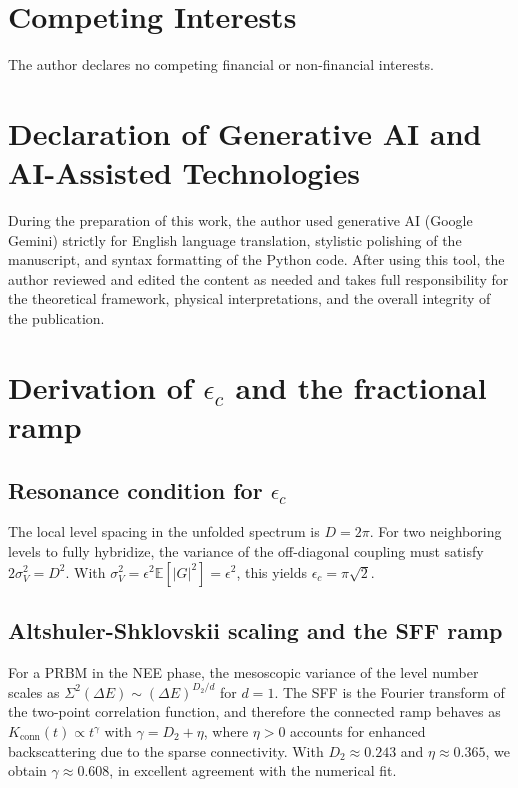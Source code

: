 \documentclass[aps,prl,preprint,superscriptaddress,floatfix]{revtex4-2}
\begin{document}
\section*{Competing Interests}
The author declares no competing financial or non-financial interests.

\section*{Declaration of Generative AI and AI-Assisted Technologies}
During the preparation of this work, the author used generative AI (Google Gemini) strictly for English language translation, stylistic polishing of the manuscript, and syntax formatting of the Python code. After using this tool, the author reviewed and edited the content as needed and takes full responsibility for the theoretical framework, physical interpretations, and the overall integrity of the publication.

\appendix

\section{Derivation of $\epsilon_c$ and the fractional ramp}
\label{app:ramp}

\subsection{Resonance condition for $\epsilon_c$}
The local level spacing in the unfolded spectrum is $D=2\pi$. For two neighboring levels to fully hybridize, the variance of the off-diagonal coupling must satisfy $2\sigma_V^2 = D^2$. With $\sigma_V^2 = \epsilon^2 \mathbb{E}[|G|^2] = \epsilon^2$, this yields $\epsilon_c = \pi\sqrt{2}$.

\subsection{Altshuler-Shklovskii scaling and the SFF ramp}
For a PRBM in the NEE phase, the mesoscopic variance of the level number scales as $\Sigma^2(\Delta E) \sim (\Delta E)^{D_2/d}$ for $d=1$. The SFF is the Fourier transform of the two-point correlation function, and therefore the connected ramp behaves as $K_{\text{conn}}(t) \propto t^{\gamma}$ with $\gamma = D_2 + \eta$, where $\eta>0$ accounts for enhanced backscattering due to the sparse connectivity. With $D_2\approx0.243$ and $\eta\approx0.365$, we obtain $\gamma\approx0.608$, in excellent agreement with the numerical fit.
\end{document}
